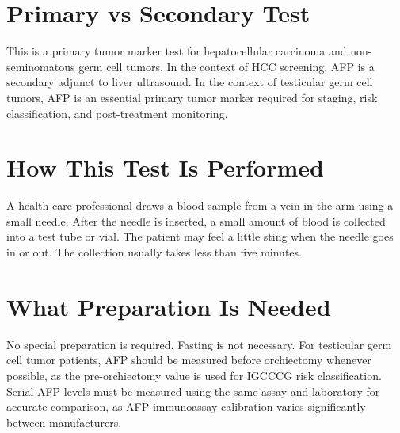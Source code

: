 \section*{Primary vs Secondary Test}
This is a primary tumor marker test for hepatocellular carcinoma and non-seminomatous germ cell tumors. In the context of HCC screening, AFP is a secondary adjunct to liver ultrasound. In the context of testicular germ cell tumors, AFP is an essential primary tumor marker required for staging, risk classification, and post-treatment monitoring.

\section*{How This Test Is Performed}
A health care professional draws a blood sample from a vein in the arm using a small needle. After the needle is inserted, a small amount of blood is collected into a test tube or vial. The patient may feel a little sting when the needle goes in or out. The collection usually takes less than five minutes.

\section*{What Preparation Is Needed}
No special preparation is required. Fasting is not necessary. For testicular germ cell tumor patients, AFP should be measured before orchiectomy whenever possible, as the pre-orchiectomy value is used for IGCCCG risk classification. Serial AFP levels must be measured using the same assay and laboratory for accurate comparison, as AFP immunoassay calibration varies significantly between manufacturers.

